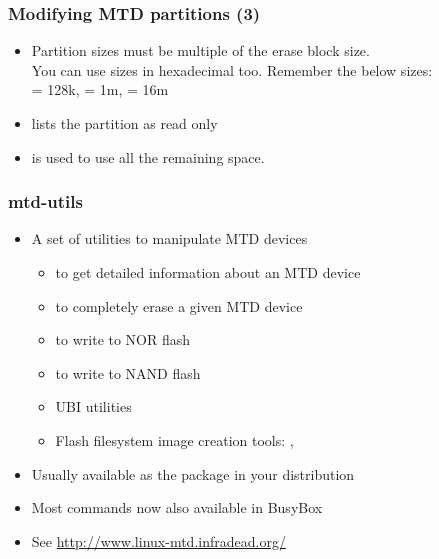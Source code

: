 \begin{frame}
  \frametitle{Modifying MTD partitions (3)}
  \begin{itemize}
  \item Partition sizes must be multiple of the erase block size.\\
    You can use sizes in hexadecimal too. Remember the below sizes:\\
     = 128k,  = 1m,  = 16m
  \item {} lists the partition as read only
  \item \code{-} is used to use all the remaining space.
  \end{itemize}
\end{frame}

\begin{frame}
  \frametitle{mtd-utils}
  \begin{itemize}
  \item A set of utilities to manipulate MTD devices
    \begin{itemize}
    \item {} to get detailed information about an MTD device
    \item {} to completely erase a given MTD device
    \item {} to write to NOR flash
    \item {} to write to NAND flash
    \item UBI utilities
    \item Flash filesystem image creation tools: ,
    \end{itemize}
  \item Usually available as the  package in your distribution
  \item Most commands now also available in BusyBox
  \item See \url{http://www.linux-mtd.infradead.org/}
  \end{itemize}
\end{frame}

